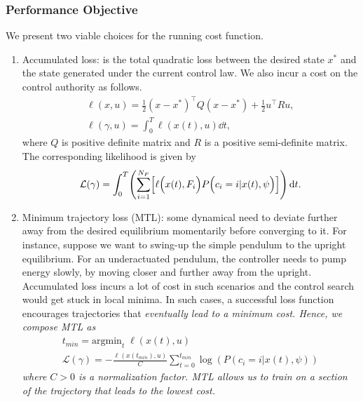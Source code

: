 \subsubsection{Performance Objective}
%
We present two viable choices for the running cost function. 
\begin{enumerate}
    \item Accumulated loss: is the total quadratic loss between the desired
    state $x^*$ and the state generated under the current control law. We also
    incur a cost on the control authority as follows.
    \begin{equation}
        \begin{gathered}
            \ell(x, u) = \frac{1}{2}(x - x^*)^\top Q (x - x^*) + \frac{1}{2} u^\top R u , \\
            \ell(\gamma, u) = \int_0^{T}  \ell(x(t), u)\dd t,
        \end{gathered}
    \label{eq:accumulatedLoss}
    \end{equation}
    \noindent where $Q$ is positive definite matrix and $R$ is a positive semi-definite matrix.
    The corresponding likelihood is given by 
    \begin{align}
        \mathcal{L}(\gamma) = \int_{0}^{T} \Biggl( \sum_{i=1}^{N_F} \Bigl[ \ell \Bigl(x(t), F_i \Bigr) P\Bigl(c_i = i | x(t), \psi \Bigr) \Bigr] \Biggr) \operatorname{d}\! t.
        \label{eq:accumulated_likelihood}
    \end{align}
    \item Minimum trajectory loss (MTL): some dynamical need to deviate further
    away from the desired equilibrium momentarily before converging to it.  
    For instance, suppose we want to swing-up the simple pendulum to the upright
    equilibrium. 
    For an underactuated pendulum, the controller needs to pump energy slowly,
    by moving closer and further away from the upright.
    Accumulated loss incurs a lot of cost in such scenarios and the control
    search would get stuck in local minima.
    In such cases, a successful loss function encourages trajectories that
    \it{eventually} \normalfont lead to a minimum cost.
    Hence, we compose MTL as
    \begin{equation}
        \begin{gathered}
            t_{min} = \text{argmin}_{t} \; \ell(x(t), u)  \\
            \mathcal{L}(\gamma) = - \frac{\ell(x(t_{min}), u)}{C} \sum_{t=0}^{t_{min}} \log(P(c_i=i| x(t), \psi)) 
        \end{gathered} 
    \end{equation}
    \noindent where $C > 0$ is a normalization factor.
    MTL allows us to train on a section of the trajectory that leads to the
    lowest cost. 
\end{enumerate}

